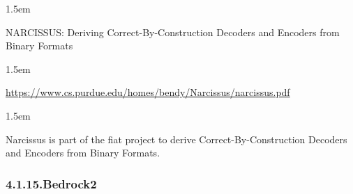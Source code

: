 \documentclass[12pt,twoside]{article}
\begin{document}
\begin{mddefinitions}

\begin{mdbmarginx}{}{}{}{1.5em}%
\begin{mddefdata}%
NARCISSUS: Deriving Correct-By-Construction Decoders and Encoders from Binary Formats
\end{mddefdata}%
\end{mdbmarginx}%

\begin{mdbmarginx}{}{}{}{1.5em}%
\begin{mddefdata}%
\href{https://www.cs.purdue.edu/homes/bendy/Narcissus/narcissus.pdf}{{\ttfamily https://\hspace{0pt}www.\hspace{0pt}cs.\hspace{0pt}purdue.\hspace{0pt}edu/\hspace{0pt}homes/\hspace{0pt}bendy/\hspace{0pt}Narcissus/\hspace{0pt}narcissus.\hspace{0pt}pdf}}
\end{mddefdata}%
\end{mdbmarginx}%


\begin{mdbmarginx}{}{}{}{1.5em}%
\begin{mddefdata}%
\end{mddefdata}%
\end{mdbmarginx}%
\end{mddefinitions}%

\noindent{}Narcissus is part of the fiat project to derive
Correct-By-Construction Decoders and Encoders from Binary Formats.%

\subsubsection{4.1.15.\hspace*{0.5em}Bedrock2}\label{sec-bedrock2}%
\end{document}

